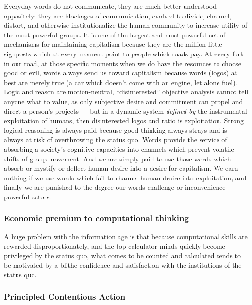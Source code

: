 \documentclass[12pt,book]{article}
\begin{document}
Everyday words do not communicate, they are much better understood
oppositely: they are blockages of communication, evolved to divide,
channel, distort, and otherwise institutionalize the human community to
increase utility of the most powerful groups. It is one of the largest
and most powerful set of mechanisms for maintaining capitalism because
they are the million little signposts which at every moment point to
people which roads pay. At every fork in our road, at those specific
moments when we do have the resources to choose good or evil, words
always send us toward capitalism because words (logos) at best are
merely true (a car which doesn't come with an engine, let alone fuel).
Logic and reason are motion-neutral, ``disinterested'' objective
analysis cannot tell anyone what to value, as only subjective desire and
commitment can propel and direct a person's projects --- but in a
dynamic system \emph{defined by} the instrumental exploitation of
humans, then disinterested logos and ratio is exploitation. Strong
logical reasoning is always paid because good thinking always strays and
is always at risk of overthrowing the status quo. Words provide the
service of absorbing a society's cognitive capacities into channels
which prevent volatile shifts of group movement. And we are simply paid
to use those words which absorb or mystify or deflect human desire into
a desire for capitalism. We earn nothing if we use words which fail to
channel human desire into exploitation, and finally we are punished to
the degree our words challenge or inconvenience powerful actors.

\subsubsection{Economic premium to computational
thinking}\label{economic-premium-to-computational-thinking}

A huge problem with the information age is that because computational
skills are rewarded disproportionately, and the top calculator minds
quickly become privileged by the status quo, what comes to be counted
and calculated tends to be motivated by a blithe confidence and
satisfaction with the institutions of the status quo.

\subsubsection{Principled Contentious
Action}\label{principled-contentious-action}
\end{document}
